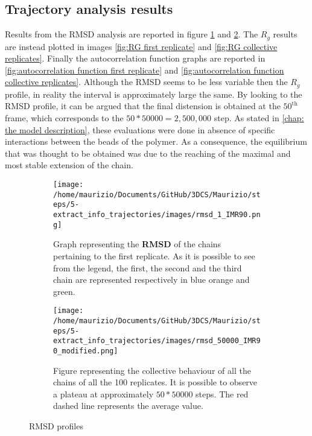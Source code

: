 \subsection{Trajectory analysis results} \label{chap: trajectory analysis results}

Results from the RMSD analysis are reported in figure \ref{fig:RMSD first replicate} and \ref{fig:RMSD collective replicates}. The $R_g$ results are instead plotted in images \ref{fig:RG first replicate} and \ref{fig:RG collective replicates}. Finally the autocorrelation function graphs are reported in \ref{fig:autocorrelation function first replicate} and \ref{fig:autocorrelation function collective replicates}. Although the RMSD seems to be less variable then the $R_g$ profile, in reality the interval is approximately large the same. By looking to the RMSD profile, it can be argued that the final distension is obtained at the $50^{\text{th}}$ frame, which corresponds to the $50 * 50000 = 2,500,000$ step. As stated in \ref{chap: the model description}, these evaluations were done in absence of specific interactions between the beads of the polymer. As a consequence, the equilibrium that was thought to be obtained was due to the reaching of the maximal and most stable extension of the chain. 


\begin{figure}[H]
    \centering
    
    \begin{subfigure}{0.70\textwidth}
      \texttt{[image: /home/maurizio/Documents/GitHub/3DCS/Maurizio/steps/5-extract\_info\_trajectories/images/rmsd\_1\_IMR90.png]}
      \caption{Graph representing the \textbf{RMSD} of the chains pertaining to the first replicate. As it is possible to see from the legend, the first, the second and the third chain are represented respectively in blue orange and green.}
      \label{fig:RMSD first replicate}
    \end{subfigure}
    \hfill
    \begin{subfigure}{0.70\textwidth}
      \texttt{[image: /home/maurizio/Documents/GitHub/3DCS/Maurizio/steps/5-extract\_info\_trajectories/images/rmsd\_50000\_IMR90\_modified.png]}
      \caption{Figure representing the collective behaviour of all the chains of all the 100 replicates. It is possible to observe a plateau at approximately $50*50000$ steps. The red dashed line represents the average value.}
      \label{fig:RMSD collective replicates}
    \end{subfigure}
  
    \caption{RMSD profiles}
    \label{fig:RMSD figures}
\end{figure}


